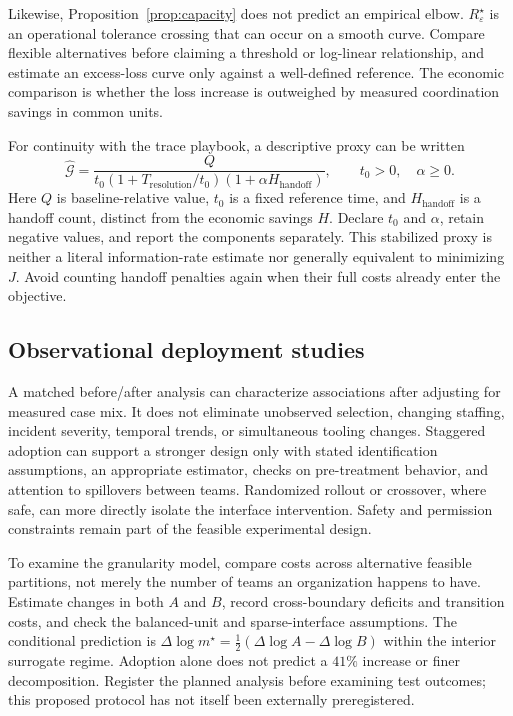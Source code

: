 \documentclass[11pt]{article}
\newcommand{\calG}{\mathcal{G}}
\begin{document}
Likewise, Proposition~\ref{prop:capacity} does not predict an empirical elbow.
$R^\star_\varepsilon$ is an operational tolerance crossing that can occur on
a smooth curve. Compare flexible alternatives before claiming a threshold or
log-linear relationship, and estimate an excess-loss curve only against a
well-defined reference. The economic comparison is whether the loss increase
is outweighed by measured coordination savings in common units.

For continuity with the trace playbook, a descriptive proxy can be written
\[
\widehat{\calG}=
\frac{Q}{t_0(1+T_{\mathrm{resolution}}/t_0)(1+\alpha H_{\mathrm{handoff}})},
\qquad t_0>0,\quad\alpha\geq0.
\]
Here $Q$ is baseline-relative value, $t_0$ is a fixed reference time, and
$H_{\mathrm{handoff}}$ is a handoff count, distinct from the economic savings
$H$. Declare $t_0$ and $\alpha$, retain negative values, and report the
components separately. This stabilized proxy is neither a literal
information-rate estimate nor generally equivalent to minimizing $J$.
Avoid counting handoff penalties again when their full costs already enter
the objective.

\subsection{Observational deployment studies}

A matched before/after analysis can characterize associations after adjusting
for measured case mix. It does not eliminate unobserved selection, changing
staffing, incident severity, temporal trends, or simultaneous tooling changes.
Staggered adoption can support a stronger design only with stated identification
assumptions, an appropriate estimator, checks on pre-treatment behavior, and
attention to spillovers between teams. Randomized rollout or crossover, where
safe, can more directly isolate the interface intervention. Safety and
permission constraints remain part of the feasible experimental design.

To examine the granularity model, compare costs across alternative feasible
partitions, not merely the number of teams an organization happens to have.
Estimate changes in both $A$ and $B$, record cross-boundary deficits and
transition costs, and check the balanced-unit and sparse-interface assumptions.
The conditional prediction is
$\Delta\log m^\star=\tfrac12(\Delta\log A-\Delta\log B)$ within the
interior surrogate regime. Adoption alone does not predict a $41\%$ increase
or finer decomposition. Register the planned analysis before examining test
outcomes; this proposed protocol has not itself been externally preregistered.
\end{document}
